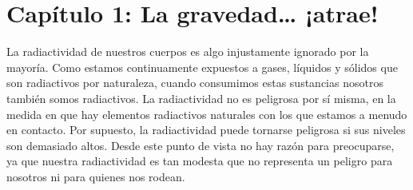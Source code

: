\section*{Capítulo 1: La gravedad… ¡atrae!}
\begin{description}[style=multiline,leftmargin=2em,labelwidth=1.5em]

\item[1.]\hypertarget{note:01-01}{}La radiactividad de nuestros cuerpos es algo
injustamente ignorado por la mayoría. Como estamos continuamente expuestos a gases,
líquidos y sólidos que son radiactivos por naturaleza, cuando consumimos estas
sustancias nosotros también somos radiactivos. La radiactividad no es peligrosa
por sí misma, en la medida en que hay elementos radiactivos naturales con los que
estamos a menudo en contacto. Por supuesto, la radiactividad puede tornarse peligrosa
si sus niveles son demasiado altos. Desde este punto de vista no hay razón para
preocuparse, ya que nuestra radiactividad es tan modesta que no representa un peligro
para nosotros ni para quienes nos rodean.

\end{description}
